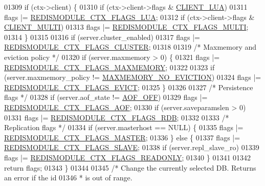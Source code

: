 \begin{DoxyCode}
{{{01309     \textcolor{keywordflow}{if} (ctx->client) \{
01310         \textcolor{keywordflow}{if} (ctx->client->flags & \hyperlink{server_8h_af9d0b0f45ef2c1fd29ac714a300de706}{CLIENT\_LUA})
01311          flags |= \hyperlink{redismodule_8h_ae1eac2a152ac7acd3ac8c7eb84d3bc45}{REDISMODULE\_CTX\_FLAGS\_LUA};
01312         \textcolor{keywordflow}{if} (ctx->client->flags & \hyperlink{server_8h_a7f61f783f429419f8c593291a509b03a}{CLIENT\_MULTI})
01313          flags |= \hyperlink{redismodule_8h_a2498b6bcdcdc1733a2913a23d23c2b56}{REDISMODULE\_CTX\_FLAGS\_MULTI};
01314     \}
01315 
01316     \textcolor{keywordflow}{if} (server.cluster\_enabled)
01317         flags |= \hyperlink{redismodule_8h_a5c34f8b64241bbbd00bc3df9c3c08844}{REDISMODULE\_CTX\_FLAGS\_CLUSTER};
01318 
01319     \textcolor{comment}{/* Maxmemory and eviction policy */}
01320     \textcolor{keywordflow}{if} (server.maxmemory > 0) \{
01321         flags |= \hyperlink{redismodule_8h_a8c676eb00ac368cca7c8515aa115213d}{REDISMODULE\_CTX\_FLAGS\_MAXMEMORY};
01322 
01323         \textcolor{keywordflow}{if} (server.maxmemory\_policy != \hyperlink{server_8h_a418e5a222cf659c003df77830f1ae343}{MAXMEMORY\_NO\_EVICTION})
01324             flags |= \hyperlink{redismodule_8h_acc6e7822ea410be48f1006b39cf8c487}{REDISMODULE\_CTX\_FLAGS\_EVICT};
01325     \}
01326 
01327     \textcolor{comment}{/* Persistence flags */}
01328     \textcolor{keywordflow}{if} (server.aof\_state != \hyperlink{server_8h_a5226306fbcebcb6d5d02e0fef3c213c2}{AOF\_OFF})
01329         flags |= \hyperlink{redismodule_8h_a33ce10fefe981f7c6f3676b8d6ed6195}{REDISMODULE\_CTX\_FLAGS\_AOF};
01330     \textcolor{keywordflow}{if} (server.saveparamslen > 0)
01331         flags |= \hyperlink{redismodule_8h_a27a5c58d9cbaba98c06c532d09dc7a41}{REDISMODULE\_CTX\_FLAGS\_RDB};
01332 
01333     \textcolor{comment}{/* Replication flags */}
01334     \textcolor{keywordflow}{if} (server.masterhost == NULL) \{
01335         flags |= \hyperlink{redismodule_8h_a4ada8d595eeaaea1d343cafaab7be85a}{REDISMODULE\_CTX\_FLAGS\_MASTER};
01336     \} \textcolor{keywordflow}{else} \{
01337         flags |= \hyperlink{redismodule_8h_ae6c2d2900511d92be4f9ecab6a330459}{REDISMODULE\_CTX\_FLAGS\_SLAVE};
01338         \textcolor{keywordflow}{if} (server.repl\_slave\_ro)
01339             flags |= \hyperlink{redismodule_8h_a58e4767512e8e1491f048cb77ac9371f}{REDISMODULE\_CTX\_FLAGS\_READONLY};
01340     \}
01341 
01342     \textcolor{keywordflow}{return} flags;
01343 \}
01344 
01345 \textcolor{comment}{/* Change the currently selected DB. Returns an error if the id}
01346 \textcolor{comment}{ * is out of range.}
}}}
\end{DoxyCode}
